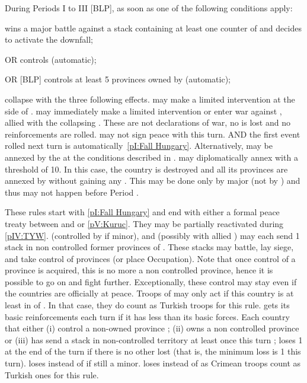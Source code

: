  \hfill {}\label{chSpecific:Hungary}
\bparag During Periods I to III [BLP], as soon as one of the
following conditions apply:
\begin{modlist}
\item \TUR wins a major battle against a stack containing at least one
  \ARMY counter of \paysHongrie and decides to activate the downfall;
\item[OR] \TUR controls \villeBuda (automatic);
\item[OR] [BLP] \TUR controls at least 5 provinces owned by
  \paysHongrie (automatic);
\end{modlist}
\paysHongrie collapse with the three following effects.
\bparag \POL may make a limited intervention at the side of
\paysHongrie. \HAB may immediately make a limited intervention or
enter war against \TUR, allied with the collapsing \paysHongrie. These
are not declarations of war, no \STAB is lost and no reinforcements are
rolled.
\bparag \TUR may not sign peace with \paysHongrie this turn.
\bparag AND the first event rolled next turn is
automatically~\ref{pI:Fall Hungary}.
\bparag Alternatively,  may be annexed by the \hab at the
conditions described in .
\bparag[] [BLP] \AUS may diplomatically annex \paysHongrie with a
threshold of 10. In this case, the country is destroyed and all its
provinces are annexed by \AUS without gaining any \VPs. This may be
done only by major \AUS (not by \HAB) and thus may not happen before
Period .

 \hfill
{}\label{chSpecific:Little war}
\bparag These rules start with \ref{pI:Fall Hungary} and end with
either a formal peace treaty between \TUR and \AUS or
\ref{pV:Kuruc}. They may be partially reactivated during \ref{pIV:TYW}.
\bparag \AUS (controlled by \HIS if minor), \POL and \TUR (possibly
with allied \paysCrimee) may each send 1 stack in non controlled
former provinces of \paysHongrie.
\bparag These stacks may battle, lay siege, and take control of
provinces (or place Occupation). Note that once control of a province
is acquired, this is no more a non controlled province, hence it is
possible to go on and fight further.
\bparag Exceptionally, these control may stay even if the countries
are officially at peace.
\bparag Troops of \paysCrimee may only act if this country is at least
in \EW of \TUR. In that case, they do count as Turkish troops for this
rule. \paysCrimee gets its basic reinforcements each turn if it has
less than its basic forces.
\bparag Each country that either (i) control a non-owned province ;
(ii) owns a non controlled province or (iii) has send a stack in
non-controlled territory at least once this turn ; loses 1 \STAB at
the end of the turn if there is no other \STAB lost (that is, the
minimum loss is 1 \STAB this turn). \HIS loses \STAB instead of \AUS
if still a minor. \TUR loses \STAB instead of \paysCrimee as Crimean
troops count as Turkish ones for this rule.



